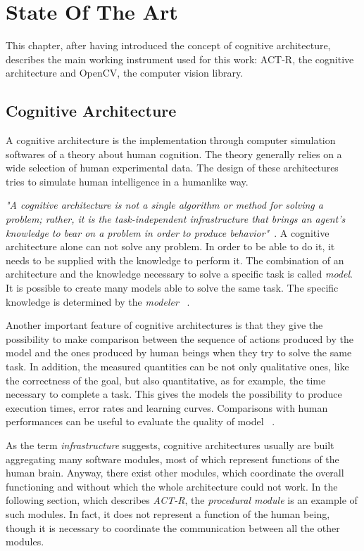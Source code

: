 \chapter{State Of The Art}
  This chapter, after having introduced the concept of cognitive architecture, describes the main working instrument used for this work: \mbox{ACT-R,} the cognitive architecture and \mbox{OpenCV,} the computer vision library. 
  \section{Cognitive Architecture}	
	A cognitive architecture is the implementation through computer simulation softwares  of a theory about human cognition. The theory generally relies on a wide selection of human experimental data. The design of these architectures tries to simulate human intelligence in a humanlike way.
	
	\textit{"A cognitive architecture is not a single algorithm or method for solving a problem; rather, it is the task-independent infrastructure that brings an agent’s knowledge to bear on a problem in order to produce behavior"}~\cite{SoarCogArch2012}. A cognitive architecture alone can not solve any problem. In order to be able to do it, it needs to be supplied with the knowledge to perform it. The combination of an architecture and the knowledge necessary to solve a specific task is called \emph{model}. It is possible to create many models able to solve the same task. The specific knowledge is determined by the \emph{modeler} ~\cite{Sears2012}. 
	
	Another important feature of cognitive architectures is that they give the possibility to make comparison between the sequence of actions produced by the model and the ones produced by human beings when they try to solve the same task. In addition, the measured quantities can be not only qualitative ones, like the correctness of the goal, but also quantitative, as for example, the time necessary to complete a task. This gives the models the possibility to produce execution times, error rates and learning curves. Comparisons with human performances can be useful to evaluate the quality of model ~\cite{Sears2012}. 
	
	As the term \emph{infrastructure} suggests, cognitive architectures usually are built aggregating many software modules, most of which represent functions of the human brain. Anyway, there exist other modules, which coordinate the overall functioning and without which the whole architecture could not work. In the following section, which describes \emph{ACT-R}, the \emph{procedural module} is an example of such modules. In fact, it does not represent a function of the human being, though it is necessary to coordinate the communication between all the other modules. 
	
